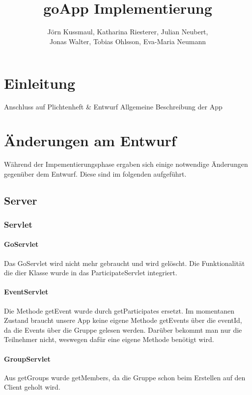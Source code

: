 \documentclass{scrartcl}
\title{goApp Implementierung}
\author{Jörn Kussmaul, Katharina Riesterer, Julian Neubert,\\ Jonas Walter, Tobias Ohlsson, Eva-Maria Neumann}
\begin{document}
	\maketitle
	\newpage
	\tableofcontents
	\newpage

	\section{Einleitung}%
	Anschluss auf Plichtenheft \& Entwurf
	Allgemeine Beschreibung der App
	
	\newpage
	\section{Änderungen am Entwurf}
	Während der Impementierungsphase ergaben sich einige notwendige Änderungen gegenüber dem Entwurf. Diese sind im folgenden aufgeführt.
	
	\subsection{Server}
	\subsubsection{Servlet}
	\paragraph{GoServlet}
	Das GoServlet wird nicht mehr gebraucht und wird gelöscht. Die Funktionalität die dier Klasse wurde in das ParticipateServlet integriert.
	
	
	\paragraph{EventServlet}
	Die Methode getEvent wurde durch getParticipates ersetzt. Im momentanen Zustand braucht unsere App keine eigene Methode getEvents über die eventId, da die Events über die Gruppe gelesen werden. 
	Darüber bekommt man nur die Teilnehmer nicht, weswegen dafür eine eigene Methode benötigt wird.
	
	\paragraph{GroupServlet}
	Aus getGroups wurde getMembers, da die Gruppe schon beim Erstellen auf den Client geholt wird. 	%
	
\end{document}
